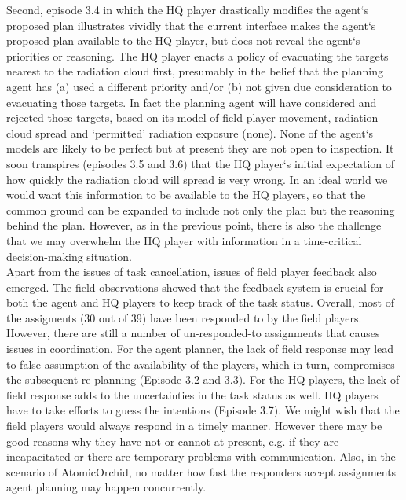 Second, episode 3.4 in which the HQ player drastically modifies the agent`s proposed plan illustrates vividly that the current interface makes the agent`s proposed plan available to the HQ player, but does not reveal the agent`s priorities or reasoning. The HQ player enacts a policy of evacuating the targets nearest to the radiation cloud first, presumably in the belief that the planning agent has (a) used a different priority and/or (b) not given due consideration to evacuating those targets. In fact the planning agent will have considered and rejected those targets, based on its model of field player movement, radiation cloud spread and `permitted' radiation exposure (none). None of the agent`s models are likely to be perfect but at present they are not open to inspection. It soon transpires (episodes 3.5 and 3.6) that the HQ player`s initial expectation of how quickly the radiation cloud will spread is very wrong. In an ideal world we would want this information to be available to the HQ players, so that the common ground can be expanded to include not only the plan but the reasoning behind the plan. However, as in the previous point, there is also the challenge that we may overwhelm the HQ player with information in a time-critical decision-making situation.\\
	 
Apart from the issues of task cancellation, issues of field player feedback also emerged. The field observations showed that the feedback system is crucial for both the agent and HQ players to keep track of the task status. Overall, most of the assigments (30 out of 39)  have been responded to by the field players. However, there are still a number of un-responded-to assignments that causes issues in coordination. For the agent planner, the lack of field response may lead to false assumption of the availability of the players, which in turn, compromises the subsequent re-planning (Episode 3.2 and 3.3). For the HQ players, the lack of field response adds to the uncertainties in the task status as well. HQ players have to take efforts to guess the intentions (Episode 3.7). We might wish that the field players would always respond in a timely manner. However there may be good reasons why they have not or cannot at present, e.g. if they are incapacitated or there are temporary problems with communication. Also, in the scenario of AtomicOrchid, no matter how fast the responders accept assignments agent planning may happen concurrently.\\

